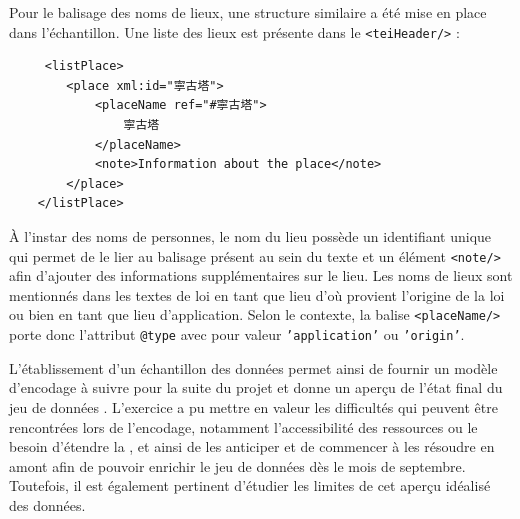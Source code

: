 Pour le balisage des noms de lieux, une structure similaire a été mise en place dans l'échantillon. Une liste des lieux est présente dans le \texttt{<teiHeader/>} : 
\begin{verbatim}
     <listPlace>
        <place xml:id="寧古塔">
            <placeName ref="#寧古塔">
                寧古塔
            </placeName>
            <note>Information about the place</note>
        </place>
    </listPlace>
\end{verbatim}
À l'instar des noms de personnes, le nom du lieu possède un identifiant unique qui permet de le lier au balisage présent au sein du texte et un élément \texttt{<note/>} afin d'ajouter des informations supplémentaires sur le lieu. Les noms de lieux sont mentionnés dans les textes de loi en tant que lieu d'où provient l'origine de la loi ou bien en tant que lieu d'application. Selon le contexte, la balise \texttt{<placeName/>} porte donc l'attribut \texttt{@type} avec pour valeur \texttt{'application'} ou \texttt{'origin'}. 

L'établissement d'un échantillon des données permet ainsi de fournir un modèle d'encodage à suivre pour la suite du projet et donne un aperçu de l'état final du jeu de données \TEI. L'exercice a pu mettre en valeur les difficultés qui peuvent être rencontrées lors de l'encodage, notamment l'accessibilité des ressources ou le besoin d'étendre la \TEI, et ainsi de les anticiper et de commencer à les résoudre en amont afin de pouvoir enrichir le jeu de données dès le mois de septembre. Toutefois, il est également pertinent d'étudier les limites de cet aperçu idéalisé des données.


